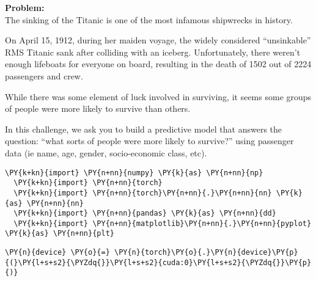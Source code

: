     \textbf{Problem:}\\

    The sinking of the Titanic is one of the most infamous shipwrecks in history.

    On April 15, 1912, during her maiden voyage, the widely considered “unsinkable” RMS Titanic sank after colliding with an iceberg. Unfortunately, there weren’t enough lifeboats for everyone on board, resulting in the death of 1502 out of 2224 passengers and crew.

    While there was some element of luck involved in surviving, it seems some groups of people were more likely to survive than others.

    In this challenge, we ask you to build a predictive model that answers the question: “what sorts of people were more likely to survive?” using passenger data (ie name, age, gender, socio-economic class, etc).


    \begin{tcolorbox}[breakable, size=fbox, boxrule=1pt, pad at break*=1mm,colback=cellbackground, colframe=cellborder]
  \begin{Verbatim}[commandchars=\\\{\}]
  \PY{k+kn}{import} \PY{n+nn}{numpy} \PY{k}{as} \PY{n+nn}{np}
  \PY{k+kn}{import} \PY{n+nn}{torch}
  \PY{k+kn}{import} \PY{n+nn}{torch}\PY{n+nn}{.}\PY{n+nn}{nn} \PY{k}{as} \PY{n+nn}{nn}
  \PY{k+kn}{import} \PY{n+nn}{pandas} \PY{k}{as} \PY{n+nn}{dd}
  \PY{k+kn}{import} \PY{n+nn}{matplotlib}\PY{n+nn}{.}\PY{n+nn}{pyplot} \PY{k}{as} \PY{n+nn}{plt}
  \end{Verbatim}
  \end{tcolorbox}

      \begin{tcolorbox}[breakable, size=fbox, boxrule=1pt, pad at break*=1mm,colback=cellbackground, colframe=cellborder]
  \begin{Verbatim}[commandchars=\\\{\}]
  \PY{n}{device} \PY{o}{=} \PY{n}{torch}\PY{o}{.}\PY{n}{device}\PY{p}{(}\PY{l+s+s2}{\PYZdq{}}\PY{l+s+s2}{cuda:0}\PY{l+s+s2}{\PYZdq{}}\PY{p}{)}
  \end{Verbatim}
  \end{tcolorbox}


